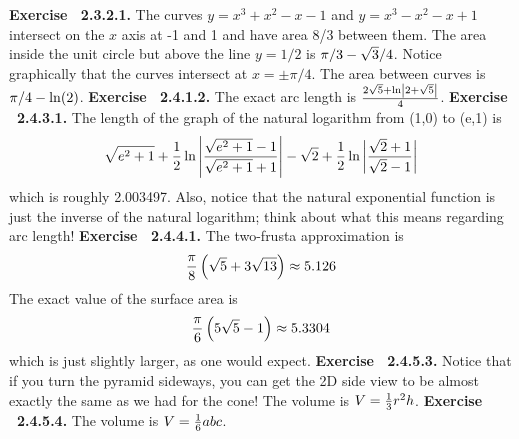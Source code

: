  {\noindent \protect \bf  Exercise ~2.3.2.1.} \textbullet The curves $y=x^3+x^2-x-1$ and $y=x^3-x^2-x+1$ intersect on the $x$ axis at -1 and 1 and have area 8/3 between them. \textbullet The area inside the unit circle but above the line $y=1/2$ is $\pi /3-\protect \sqrt  {3}/4$. \textbullet Notice graphically that the curves intersect at $x=\pm \pi /4$. The area between curves is $\pi /4-\protect \qopname  \relax o{ln}(2)$. \protect \newline  \protect \newline  
 {\noindent \protect \bf  Exercise ~2.4.1.2.} The exact arc length is $\protect \frac  {2\protect \sqrt  {5}+\protect \qopname  \relax o{ln}\left | 2+\protect \sqrt  {5}\right |}{4}$. \protect \newline  \protect \newline  
 {\noindent \protect \bf  Exercise ~2.4.3.1.} The length of the graph of the natural logarithm from (1,0) to (e,1) is $$\protect \sqrt  {e^2+1}+\protect \frac  {1}{2}\protect \qopname  \relax o{ln}\left | \protect \frac  {\protect \sqrt  {e^2+1}-1}{\protect \sqrt  {e^2+1}+1}\right |-\protect \sqrt  {2}+\protect \frac  {1}{2}\protect \qopname  \relax o{ln}\left | \protect \frac  {\protect \sqrt  {2}+1}{\protect \sqrt  {2}-1}\right | $$ which is roughly 2.003497. Also, notice that the natural exponential function is just the inverse of the natural logarithm; think about what this means regarding arc length! \protect \newline  \protect \newline  
 {\noindent \protect \bf  Exercise ~2.4.4.1.} The two-frusta approximation is $$\protect \frac  {\pi }{8}\left (\protect \sqrt  {5}+3\protect \sqrt  {13} \right )\approx 5.126 $$ The exact value of the surface area is $$\protect \frac  {\pi }{6}\left (5\protect \sqrt  {5}-1 \right )\approx 5.3304 $$ which is just slightly larger, as one would expect.  \protect \newline  \protect \newline  
 {\noindent \protect \bf  Exercise ~2.4.5.3.} Notice that if you turn the pyramid sideways, you can get the 2D side view to be almost exactly the same as we had for the cone! The volume is $V=\protect \frac  {1}{3}r^2h$. \protect \newline  \protect \newline  
 {\noindent \protect \bf  Exercise ~2.4.5.4.} The volume is $V=\protect \frac  {1}{6}abc$. \protect \newline  \protect \newline  
